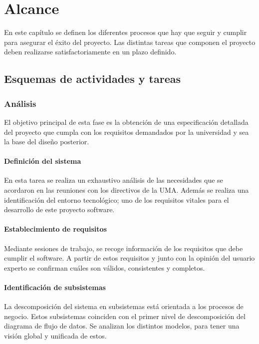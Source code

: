 \documentclass[11pt,a4paper,spanish,twoside]{book}
\begin{document}
\tableofcontents
\listoffigures

\chapter{Alcance}
En este capítulo se definen los diferentes procesos que hay que seguir y
cumplir para asegurar el éxito del proyecto. Las distintas tareas que
componen el proyecto deben realizarse satisfactoriamente en un plazo
definido.

\section{Esquemas de actividades y tareas}

\subsection{Análisis}
El objetivo principal de esta fase es la obtención de una especificación
detallada del proyecto que cumpla con los requisitos demandados por la 
universidad y sea la base del diseño posterior.

\subsubsection{Definición del sistema}
En esta tarea se realiza un exhaustivo análisis de las necesidades que se
acordaron en las reuniones con los directivos de la UMA. Además se realiza una
identificación del entorno tecnológico; uno de los requisitos vitales para el
desarrollo de este proyecto software.

\subsubsection{Establecimiento de requisitos}
Mediante sesiones de trabajo, se recoge información de los requisitos que debe
cumplir el software. A partir de estos requisitos y junto con la opinión del 
usuario experto se confirman cuáles son válidos, consistentes y completos.

\subsubsection{Identificación de subsistemas}
La descomposición del sistema en subsistemas está orientada a los procesos de
negocio. Estos subsistemas coinciden con el primer nivel de descomposición
del diagrama de flujo de datos. Se analizan los distintos modelos, para tener
una visión global y unificada de estos.
\end{document}
